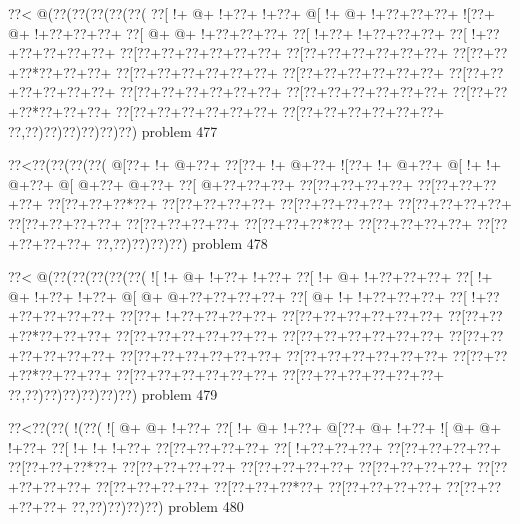 \vbox{\vbox{\goo
\0??<\- @(\0??(\0??(\0??(\0??(\0??(
\0??[\- !+\- @+\- !+\0??+\- !+\0??+
\- @[\- !+\- @+\- !+\0??+\0??+\0??+
\- ![\0??+\- @+\- !+\0??+\0??+\0??+
\0??[\- @+\- @+\- !+\0??+\0??+\0??+
\0??[\- !+\0??+\- !+\0??+\0??+\0??+
\0??[\- !+\0??+\0??+\0??+\0??+\0??+
\0??[\0??+\0??+\0??+\0??+\0??+\0??+
\0??[\0??+\0??+\0??+\0??+\0??+\0??+
\0??[\0??+\0??+\0??*\0??+\0??+\0??+
\0??[\0??+\0??+\0??+\0??+\0??+\0??+
\0??[\0??+\0??+\0??+\0??+\0??+\0??+
\0??[\0??+\0??+\0??+\0??+\0??+\0??+
\0??[\0??+\0??+\0??+\0??+\0??+\0??+
\0??[\0??+\0??+\0??+\0??+\0??+\0??+
\0??[\0??+\0??+\0??*\0??+\0??+\0??+
\0??[\0??+\0??+\0??+\0??+\0??+\0??+
\0??[\0??+\0??+\0??+\0??+\0??+\0??+
\0??,\0??)\0??)\0??)\0??)\0??)\0??)
}
\hfil problem 477\hfil\break
}

\vbox{\vbox{\goo
\0??<\0??(\0??(\0??(\0??(
\- @[\0??+\- !+\- @+\0??+
\0??[\0??+\- !+\- @+\0??+
\- ![\0??+\- !+\- @+\0??+
\- @[\- !+\- !+\- @+\0??+
\- @[\- @+\0??+\- @+\0??+
\0??[\- @+\0??+\0??+\0??+
\0??[\0??+\0??+\0??+\0??+
\0??[\0??+\0??+\0??+\0??+
\0??[\0??+\0??+\0??*\0??+
\0??[\0??+\0??+\0??+\0??+
\0??[\0??+\0??+\0??+\0??+
\0??[\0??+\0??+\0??+\0??+
\0??[\0??+\0??+\0??+\0??+
\0??[\0??+\0??+\0??+\0??+
\0??[\0??+\0??+\0??*\0??+
\0??[\0??+\0??+\0??+\0??+
\0??[\0??+\0??+\0??+\0??+
\0??,\0??)\0??)\0??)\0??)
}
\hfil problem 478\hfil\break
}

\vbox{\vbox{\goo
\0??<\- @(\0??(\0??(\0??(\0??(\0??(
\- ![\- !+\- @+\- !+\0??+\- !+\0??+
\0??[\- !+\- @+\- !+\0??+\0??+\0??+
\0??[\- !+\- @+\- !+\0??+\- !+\0??+
\- @[\- @+\- @+\0??+\0??+\0??+\0??+
\0??[\- @+\- !+\- !+\0??+\0??+\0??+
\0??[\- !+\0??+\0??+\0??+\0??+\0??+
\0??[\0??+\- !+\0??+\0??+\0??+\0??+
\0??[\0??+\0??+\0??+\0??+\0??+\0??+
\0??[\0??+\0??+\0??*\0??+\0??+\0??+
\0??[\0??+\0??+\0??+\0??+\0??+\0??+
\0??[\0??+\0??+\0??+\0??+\0??+\0??+
\0??[\0??+\0??+\0??+\0??+\0??+\0??+
\0??[\0??+\0??+\0??+\0??+\0??+\0??+
\0??[\0??+\0??+\0??+\0??+\0??+\0??+
\0??[\0??+\0??+\0??*\0??+\0??+\0??+
\0??[\0??+\0??+\0??+\0??+\0??+\0??+
\0??[\0??+\0??+\0??+\0??+\0??+\0??+
\0??,\0??)\0??)\0??)\0??)\0??)\0??)
}
\hfil problem 479\hfil\break
}

\vbox{\vbox{\goo
\0??<\0??(\0??(\- !(\0??(
\- ![\- @+\- @+\- !+\0??+
\0??[\- !+\- @+\- !+\0??+
\- @[\0??+\- @+\- !+\0??+
\- ![\- @+\- @+\- !+\0??+
\0??[\- !+\- !+\- !+\0??+
\0??[\0??+\0??+\0??+\0??+
\0??[\- !+\0??+\0??+\0??+
\0??[\0??+\0??+\0??+\0??+
\0??[\0??+\0??+\0??*\0??+
\0??[\0??+\0??+\0??+\0??+
\0??[\0??+\0??+\0??+\0??+
\0??[\0??+\0??+\0??+\0??+
\0??[\0??+\0??+\0??+\0??+
\0??[\0??+\0??+\0??+\0??+
\0??[\0??+\0??+\0??*\0??+
\0??[\0??+\0??+\0??+\0??+
\0??[\0??+\0??+\0??+\0??+
\0??,\0??)\0??)\0??)\0??)
}
\hfil problem 480\hfil\break
}

